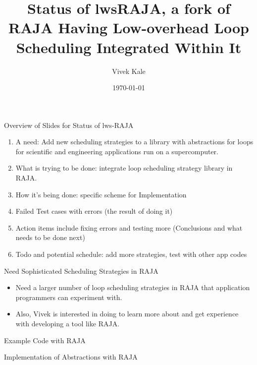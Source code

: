 \documentclass{beamer}
\title[Status of lwsRAJA]{Status of lwsRAJA, a fork of RAJA Having Low-overhead Loop Scheduling Integrated Within It}
\author{Vivek Kale}
\date{\today}
\begin{document}
 

\begin{frame}
\titlepage
\end{frame}

\begin{frame}[label=ovwlwsRAJAstatus]{Overview of Slides for Status of lws-RAJA}
\begin{enumerate}
\item A need: Add new scheduling strategies to a library with abstractions for loops for scientific and engineering applications run on a supercomputer.
\item What is trying to be done: integrate loop scheduling strategy library in RAJA.
\item How it's being done: specific scheme for Implementation 
\item Failed Test cases with errors (the result of doing it) 
\item Action items include fixing errors and testing more (Conclusions and what needs to be done next)
\item Todo and potential schedule: add more strategies, test with other app codes
\end{enumerate}
\end{frame}

\begin{frame}{Need Sophisticated Scheduling Strategies in RAJA}
\begin{itemize}
\item Need a larger number of loop scheduling strategies in RAJA that application programmers can experiment with.
\item Also, Vivek is interested in doing to learn more about and get experience with developing a tool like RAJA. 
\end{itemize} 
\end{frame}


\begin{frame}{Example Code with RAJA}
\begin{figure}[ht!] 

\end{figure}
\end{frame}

\begin{frame}{Implementation of Abstractions with RAJA}
\begin{figure}[ht!] 

\end{figure}
\end{frame}
\end{document}

